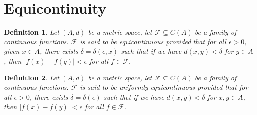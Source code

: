 \documentclass[11pt]{book}
\theoremstyle{break}
\theoremstyle{break}
\newtheorem{defn}{Definition}[corL]
\begin{document}
\newpage
\section[Equicontinuity]{\color{red}Equicontinuity\color{black}}
\begin{defn}
Let $(A,d)$ be a metric space, let $\mathcal{F} \subseteq C(A)$ be a family of continuous functions. $\mathcal{F}$ is said to be equicontinuous provided that for all $\epsilon>0$, given $x \in A$, there exists $\delta = \delta(\epsilon,x)$ such that if we have $d(x,y) < \delta$ for $y \in A$, then $|f(x) - f(y)|<\epsilon$ for all $f \in \mathcal{F}$. 
\end{defn}


\begin{defn}
Let $(A,d)$ be a metric space, let $\mathcal{F} \subseteq C(A)$ be a family of continuous functions. $\mathcal{F}$ is said to be uniformly equicontinuous provided that for all $\epsilon>0$, there exists $\delta = \delta(\epsilon)$ such that if we have $d(x,y) < \delta$ for $x,y \in A$, then $|f(x) - f(y)|<\epsilon$ for all $f \in \mathcal{F}$. 
\end{defn}
\end{document}
